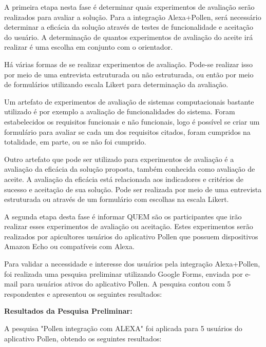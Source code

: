 A primeira etapa nesta fase é determinar quais experimentos de avaliação serão realizados para avaliar a solução. Para a integração Alexa+Pollen, será necessário determinar a eficácia da solução através de testes de funcionalidade e aceitação do usuário. A determinação de quantos experimentos de avaliação do aceite irá realizar é uma escolha em conjunto com o orientador.

Há várias formas de se realizar experimentos de avaliação. Pode-se realizar isso por meio de uma entrevista estruturada ou não estruturada, ou então por meio de formulários utilizando escala Likert para determinação da avaliação.

Um artefato de experimentos de avaliação de sistemas computacionais bastante utilizado é por exemplo a avaliação de funcionalidades do sistema. Foram estabelecidos os requisitos funcionais e não funcionais, logo é possível se criar um formulário para avaliar se cada um dos requisitos citados, foram cumpridos na totalidade, em parte, ou se não foi cumprido.

Outro artefato que pode ser utilizado para experimentos de avaliação é a avaliação da eficácia da solução proposta, também conhecida como avaliação de aceite. A avaliação da eficácia está relacionada aos indicadores e critérios de sucesso e aceitação de sua solução. Pode ser realizada por meio de uma entrevista estruturada ou através de um formulário com escolhas na escala Likert.

A segunda etapa desta fase é informar QUEM são os participantes que irão realizar esses experimentos de avaliação ou aceitação. Estes experimentos serão realizados por apicultores usuários do aplicativo Pollen que possuem dispositivos Amazon Echo ou compatíveis com Alexa. 

Para validar a necessidade e interesse dos usuários pela integração Alexa+Pollen, foi realizada uma pesquisa preliminar utilizando Google Forms, enviada por e-mail para usuários ativos do aplicativo Pollen. A pesquisa contou com 5 respondentes e apresentou os seguintes resultados:

\textbf{Resultados da Pesquisa Preliminar:}

A pesquisa "Pollen integração com ALEXA" foi aplicada para 5 usuários do aplicativo Pollen, obtendo os seguintes resultados:

